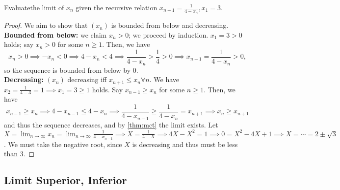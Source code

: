 \documentclass[12pt]{article}
\begin{document}
\begin{example}
  Evaluate\footnotemark the limit of $x_{n}$ given the recursive relation $x_{n+1} = \frac{1}{4-x_n}, x_1 = 3$. 
\end{example}
\begin{proof}
  We aim to show that $(x_n)$ is bounded from below and decreasing.\\
  \textbf{Bounded from below: } we claim $x_n > 0$; we proceed by induction. $x_1 = 3 > 0$ holds; say $x_{n} > 0$ for some $n \geq 1$. Then, we have \[
  x_n > 0 \implies - x_n < 0 \implies 4 - x_n < 4 \implies \frac{1}{4-x_{n}} > \frac{1}{4} > 0 \implies  x_{n+1} = \frac{1}{4-x_n} > 0,
  \]
  so the sequence is bounded from below by 0.\\
  \textbf{Decreasing: } $(x_n)$ decreasing iff $x_{n + 1} \leq x_n \forall n$. We have $x_2 = \frac{1}{4-3} = 1 \implies x_1 = 3 \geq 1$ holds. Say $x_{n-1} \geq x_{n}$ for some $n \geq 1$. Then, we have \[
  x_{n-1} \geq x_n \implies 4 - x_{n-1} \leq 4 - x_{n} \implies \frac{1}{4-x_{n-1}}\geq \frac{1}{4-x_n} = x_{n+1}\implies x_{n} \geq x_{n+1}
  \]
  and thus the sequence decreases, and by \cref{thm:mct} the limit exists. Let $X = \lim_{n\to\infty} x_{n} = \lim_{n\to\infty} \frac{1}{4-x_{n-1}} \implies X = \frac{1}{4-X} \implies 4X-X^2 = 1 \implies 0 = X^2-4X+1 \implies X = \cdots = 2 \pm \sqrt{3}$. We must take the negative root, since $X$ is decreasing and thus must be less than $3$. 
\end{proof}

\subsection{Limit Superior, Inferior}
\end{document}
